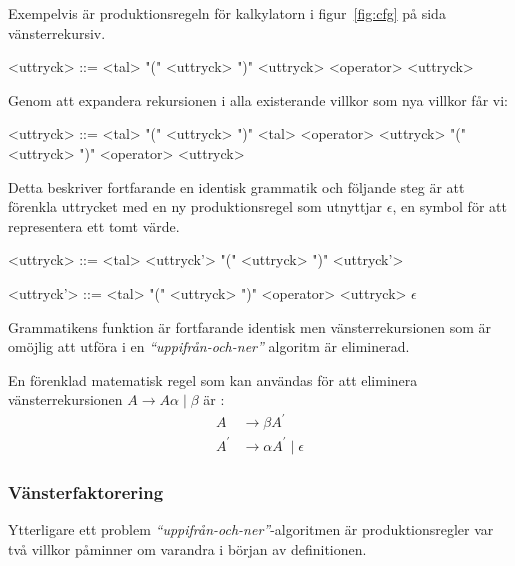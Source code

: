 Exempelvis är produktionsregeln för kalkylatorn i figur~\ref{fig:cfg} på sida
\pageref{fig:cfg} vänsterrekursiv.

\setlength{\grammarindent}{5em}
\begin{grammar}
  \singlespace\small%
  \selectfont
  <uttryck> ::= <tal>
    \alt "(" <uttryck> ")"
    \alt <uttryck> <operator> <uttryck>
\end{grammar}

Genom att expandera rekursionen i alla existerande villkor som nya villkor får
vi:

\setlength{\grammarindent}{5em}
\begin{grammar}
  \singlespace\small%
  \selectfont
  <uttryck> ::= <tal>
    \alt "(" <uttryck> ")"
    \alt <tal> <operator> <uttryck>
    \alt "(" <uttryck> ")" <operator> <uttryck>
\end{grammar}

Detta beskriver fortfarande en identisk grammatik och följande steg är att
förenkla uttrycket med en ny produktionsregel som utnyttjar $\epsilon$, en
symbol för att representera ett tomt värde.

\setlength{\grammarindent}{5em}
\begin{grammar}
  \singlespace\small%
  \selectfont
  <uttryck> ::= <tal> <uttryck'>
    \alt "(" <uttryck> ")" <uttryck'>

  <uttryck'> ::= <tal>
    \alt "(" <uttryck> ")"
    \alt <operator> <uttryck>
    \alt $\epsilon$
\end{grammar}

Grammatikens funktion är fortfarande identisk men vänsterrekursionen som är
omöjlig att utföra i en \textit{``uppifrån-och-ner''} algoritm är eliminerad.

En förenklad matematisk regel som kan användas för att eliminera
vänsterrekursionen $A \rightarrow A\alpha\;|\;\beta$ är \citep[s. 212]{aa06}:
\begin{align*}
A &\rightarrow \beta A^\prime \\
A^\prime &\rightarrow \alpha A^\prime\;|\;\epsilon
\end{align*}

\subsubsection{Vänsterfaktorering}

Ytterligare ett problem \textit{``uppifrån-och-ner''}-algoritmen är
produktionsregler var två villkor påminner om varandra i början av
definitionen.

